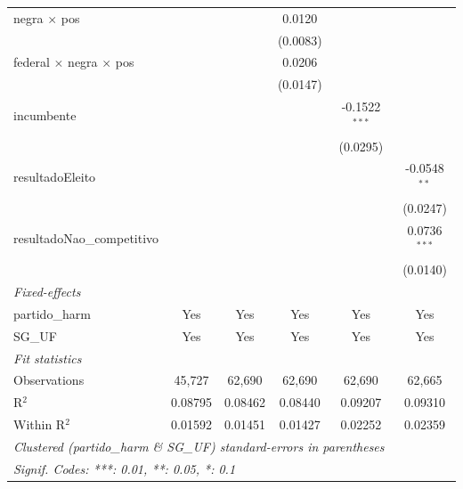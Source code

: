 \begin{tabular}{lccccc}
   negra $\times$ pos                        &                       &                 & 0.0120          &                    &   \\   
                                             &                       &                 & (0.0083)        &                    &   \\   
   federal $\times$ negra $\times$ pos       &                       &                 & 0.0206          &                    &   \\   
                                             &                       &                 & (0.0147)        &                    &   \\   
   incumbente                                &                       &                 &                 & -0.1522$^{***}$    &   \\   
                                             &                       &                 &                 & (0.0295)           &   \\   
   resultadoEleito                           &                       &                 &                 &                    & -0.0548$^{**}$\\   
                                             &                       &                 &                 &                    & (0.0247)\\   
   resultadoNao\_competitivo                 &                       &                 &                 &                    & 0.0736$^{***}$\\   
                                             &                       &                 &                 &                    & (0.0140)\\   
   \midrule
   \emph{Fixed-effects}\\
   partido\_harm                             & Yes                   & Yes             & Yes             & Yes                & Yes\\  
   SG\_UF                                    & Yes                   & Yes             & Yes             & Yes                & Yes\\  
   \midrule
   \emph{Fit statistics}\\
   Observations                              & 45,727                & 62,690          & 62,690          & 62,690             & 62,665\\  
   R$^2$                                     & 0.08795               & 0.08462         & 0.08440         & 0.09207            & 0.09310\\  
   Within R$^2$                              & 0.01592               & 0.01451         & 0.01427         & 0.02252            & 0.02359\\  
   \midrule \midrule
   \multicolumn{6}{l}{\emph{Clustered (partido\_harm \& SG\_UF) standard-errors in parentheses}}\\
   \multicolumn{6}{l}{\emph{Signif. Codes: ***: 0.01, **: 0.05, *: 0.1}}\\
\end{tabular}
\par\endgroup


